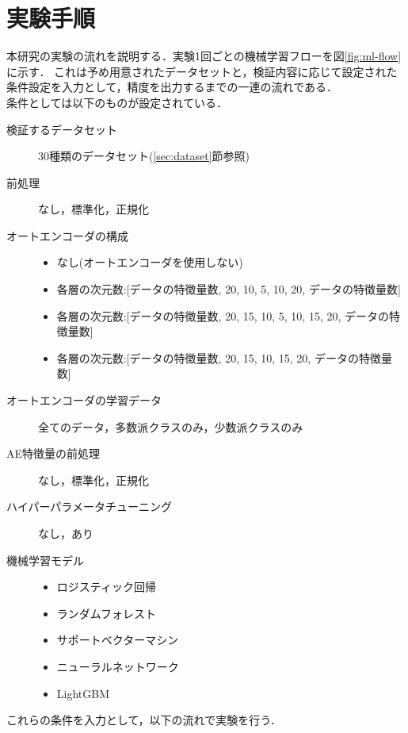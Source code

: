 \section{実験手順}
本研究の実験の流れを説明する．実験1回ごとの機械学習フローを図\ref{fig:ml-flow}に示す．
これは予め用意されたデータセットと，検証内容に応じて設定された条件設定を入力として，精度を出力するまでの一連の流れである．\\

条件としては以下のものが設定されている．
\begin{description}
    \item [検証するデータセット] 30種類のデータセット(\ref{sec:dataset}節参照)
    \item [前処理] なし，標準化，正規化
    \item [オートエンコーダの構成] \mbox{}
        \begin{itemize}
            \item なし(オートエンコーダを使用しない)
            \item 各層の次元数:[データの特徴量数, 20, 10, 5, 10, 20, データの特徴量数]
            \item 各層の次元数:[データの特徴量数, 20, 15, 10, 5, 10, 15, 20, データの特徴量数]
            \item 各層の次元数:[データの特徴量数, 20, 15, 10, 15, 20, データの特徴量数]
        \end{itemize}
    \item [オートエンコーダの学習データ] 全てのデータ，多数派クラスのみ，少数派クラスのみ
    \item [AE特徴量の前処理] なし，標準化，正規化
    \item [ハイパーパラメータチューニング] なし，あり
    \item [機械学習モデル] \mbox{}
    \begin{itemize}
        \item ロジスティック回帰
        \item ランダムフォレスト
        \item サポートベクターマシン
        \item ニューラルネットワーク
        \item LightGBM
    \end{itemize} 
\end{description}

これらの条件を入力として，以下の流れで実験を行う．

